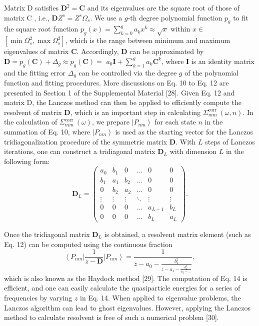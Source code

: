 Matrix D satisfies $\mathbf{D}^2=\mathbf{C}$ and its eigenvalues are the square root of those of matrix C , i.e., $\mathbf{D} Z^s=Z^s \Omega_s$. We use a $g$-th degree polynomial function $p_g$ to fit the square root function $p_g(x)=\sum_{k=0}^g a_k x^k \approx \sqrt{x}$ within $x \in$ $\left[\min \Omega_s^2, \max \Omega_s^2\right]$, which is the range between minimum and maximum eigenvalues of matrix $\mathbf{C}$. Accordingly, $\mathbf{D}$ can be approximated by $\mathbf{D}=p_g(\mathbf{C})+\Delta_g \approx p_g(\mathbf{C})=$ $a_0 \mathbf{I}+\sum_{k=1}^g a_k \mathbf{C}^k$, where $\mathbf{I}$ is an identity matrix and the fitting error $\Delta_g$ can be controlled via the degree $g$ of the polynomial function and fitting procedures. More discussions on Eq. 10 to Eq. 12 are presented in Section 1 of the Supplemental Material [28].
Given Eq. 12 and matrix D, the Lanczos method can then be applied to efficiently compute the resolvent of matrix $\mathbf{D}$, which is an important step in calculating $\Sigma_{m m}^{\text {corr }}(\omega, n)$. In the calculation of $\Sigma_{m m}^{\text {corr }}(\omega)$, we prepare $\left|P_{n m}\right\rangle$ for each state $n$ in the summation of Eq. 10, where $\left|P_{n m}\right\rangle$ is used as the starting vector for the Lanczos tridiagonalization procedure of the symmetric matrix $\mathbf{D}$. With $L$ steps of Lanczos iterations, one can construct a tridiagonal matrix $\mathbf{D}_L$ with dimension $L$ in the following form:
$$
\mathbf{D}_L=\left(\begin{array}{cccccc}
a_0 & b_1 & 0 & \ldots & 0 & 0 \\
b_1 & a_1 & b_2 & \ldots & 0 & 0 \\
0 & b_2 & a_2 & \ldots & 0 & 0 \\
\vdots & \vdots & \vdots & \ddots & \vdots & \vdots \\
0 & 0 & 0 & \ldots & a_{L-1} & b_L \\
0 & 0 & 0 & \ldots & b_L & a_L
\end{array}\right) .
$$

Once the tridiagonal matrix $\mathbf{D}_L$ is obtained, a resolvent matrix element (such as Eq. 12) can be computed using
the continuous fraction
$$
\left\langle P_{n m}\right| \frac{1}{z-\mathbf{D}}\left|P_{n m}\right\rangle=\frac{1}{z-a_0-\frac{b_1^2}{z-a_1-\frac{b_2^2}{a_2-\ldots}}},
$$
which is also known as the Haydock method [29]. The computation of Eq. 14 is efficient, and one can easily calculate the quasiparticle energies for a series of frequencies by varying $z$ in Eq. 14. When applied to eigenvalue problems, the Lanczos algorithm can lead to ghost eigenvalues. However, applying the Lanczos method to calculate resolvent is free of such a numerical problem [30].

